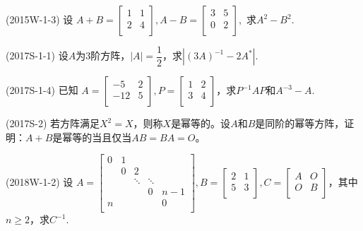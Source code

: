 \documentclass[lang=cn,newtx,10pt,scheme=chinese]{elegantbook}
\begin{document}
\begin{exercise}
    (2015W-1-3) 设
    $
    A + B =
    \left[
    \begin{matrix}
        1 & 1 \\
        2 & 4 \\
    \end{matrix}
    \right]
    , A - B =
    \left[
    \begin{matrix}
        3 & 5 \\
        0 & 2 \\
    \end{matrix}
    \right]
    ,$
    求$A^2 - B^2$.
\end{exercise}

\begin{exercise}
    (2017S-1-1) 设$A$为3阶方阵，$\left|A\right| = \dfrac{1}{2}$，求$\left|(3 A)^{-1} - 2 A^*\right|$.
\end{exercise}

\begin{exercise}
    (2017S-1-4) 已知
    $
    A = 
    \left[
    \begin{matrix}
        -5 & 2 \\
        -12 & 5 \\
    \end{matrix}
    \right]
    ,
    P = 
    \left[
    \begin{matrix}
        1 & 2 \\
        3 & 4 \\
    \end{matrix}
    \right]
    $，求$P^{-1}AP$和$A^{-3} - A$.
\end{exercise}

\begin{exercise}
    (2017S-2) 若方阵满足$X^2=X$，则称$X$是幂等的。设$A$和$B$是同阶的幂等方阵，证明：$A+B$是幂等的当且仅当$AB=BA=O$。
\end{exercise}

\begin{exercise}
    (2018W-1-2) 设
    $
    A = 
    \left[
    \begin{matrix}
        0 & 1 &         &           &       \\
          & 0 & 2       &           &       \\
          &   & \ddots  & \ddots    &       \\
          &   &         & 0         & n-1   \\
        n &   &         &           & 0     \\
    \end{matrix}
    \right],
    B = 
    \left[
    \begin{matrix}
        2 & 1 \\
        5 & 3 \\
    \end{matrix}
    \right],
    C = 
    \left[
    \begin{matrix}
        A & O \\
        O & B \\
    \end{matrix}
    \right]
    $，其中$n \ge 2$，求$C^{-1}$.
\end{exercise}
\end{document}
